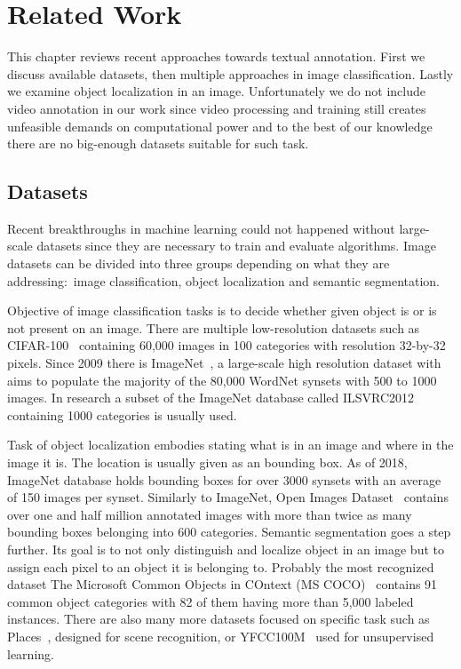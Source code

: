 \chapter{Related Work}\label{chap:related_work}
This chapter reviews recent approaches towards textual annotation. First we discuss available datasets, then multiple approaches in image classification. Lastly we examine object localization in an image. Unfortunately we do not include video annotation in our work since video processing and training still creates unfeasible demands on computational power and to the best of our knowledge there are no big-enough datasets suitable for such task.

\section{Datasets}
Recent breakthroughs in machine learning could not happened without large-scale datasets since they are necessary to train and evaluate algorithms. Image datasets can be divided into three groups depending on what they are addressing:~image classification, object localization and semantic segmentation.

Objective of image classification tasks is to decide whether given object is or is not present on an image. There are multiple low-resolution datasets such as CIFAR-100~\cite{krizhevsky2009learning} containing 60,000 images in 100 categories with resolution 32-by-32 pixels. Since 2009 there is ImageNet~\cite{ILSVRC15}, a large-scale high resolution dataset with aims to populate the majority of the 80,000 WordNet synsets with 500 to 1000 images. In research a subset of the ImageNet database called ILSVRC2012 containing 1000 categories is usually used.

Task of object localization embodies stating what is in an image and where in the image it is. The location is usually given as an bounding box. As of 2018, ImageNet database holds bounding boxes for over 3000 synsets with an average of 150 images per synset. Similarly to ImageNet, Open Images Dataset~\cite{openimages} contains over one and half million annotated images with more than twice as many bounding boxes belonging into 600 categories. Semantic segmentation goes a step further. Its goal is to not only distinguish and localize object in an image but to assign each pixel to an object it is belonging to. Probably the most recognized dataset The Microsoft Common Objects in COntext (MS COCO)~\cite{lin2014microsoft} contains 91 common object categories with 82 of them having more than 5,000 labeled instances. There are also many more datasets focused on specific task such as Places~\cite{zhou2017places}, designed for scene recognition, or YFCC100M~\cite{YFCC100M} used for unsupervised learning.

